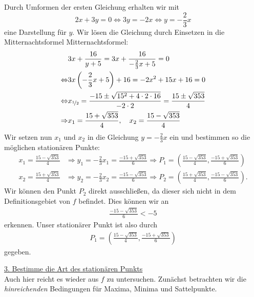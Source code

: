 Durch Umformen der ersten Gleichung erhalten wir mit
\begin{equation*}
2x + 3y = 0 
\Leftrightarrow
3y = -2x
\Leftrightarrow
y = -\frac{2}{3} x 
\end{equation*}
eine Darstellung für $y$.
Wir lösen die Gleichung durch Einsetzen in die Mitternachtsformel Mitternachtsformel:
\begin{equation*}
\begin{split}
&3x + \frac{16}{y+5} = 3x + \frac{16}{-\frac{2}{3}x+5} = 0\\
\Leftrightarrow
&3x \left( -\frac{2}{3}x+5 \right) + 16 = -2 x^2 + 15 x + 16 = 0\\
\Leftrightarrow
&x_{\nicefrac{1}{2}}= \frac{- 15 \pm \sqrt{15^2 + 4 \cdot 2 \cdot 16}}{- 2 \cdot 2} 
= \frac{15 \pm \sqrt{353}}{4}\\
\Rightarrow
&x_1 = \frac{15 + \sqrt{353}}{4}, \quad
x_2 = \frac{15 - \sqrt{353}}{4}
\end{split}
\end{equation*}
Wir setzen nun $x_1$ und $x_2$ in die Gleichung $y = -\frac{2}{3} x$ ein und bestimmen so die möglichen stationären Punkte:
\begin{equation*}
\begin{split}
x_1  = \frac{15 - \sqrt{353}}{4}
&\Rightarrow
y_1 = -\frac{2}{3} x_1 = \frac{-15 + \sqrt{353}}{6}
\Rightarrow
P_1 = \left( \frac{15 - \sqrt{353}}{4}, \frac{-15 + \sqrt{353}}{6} \right)
\\
x_2  = \frac{15 + \sqrt{353}}{4}
&\Rightarrow
y_2 = -\frac{2}{3} x_2 = \frac{-15 - \sqrt{353}}{6}
\Rightarrow
P_2 = \left( \frac{15 + \sqrt{353}}{4}, \frac{-15 - \sqrt{353}}{6} \right).
\end{split}
\end{equation*}
Wir können den Punkt $P_2$ direkt ausschließen, da dieser sich nicht in dem Definitionsgebiet von $f$ befindet.
Dies können wir an
\begin{align*}
\frac{-15 - \sqrt{353}}{6} < -5
\end{align*}
erkennen.
Unser stationärer Punkt ist also durch
\begin{align*}
P_1 = \left( \frac{15 - \sqrt{353}}{4}, \frac{-15 + \sqrt{353}}{6} \right)
\end{align*}
gegeben.\\

\newpage

\underline{3. Bestimme die Art des stationären Punkts}\\
Auch hier reicht es wieder aus $f$ zu untersuchen.
Zunächst betrachten wir die \textit{hinreichenden} Bedingungen für Maxima, Minima und Sattelpunkte.\\

